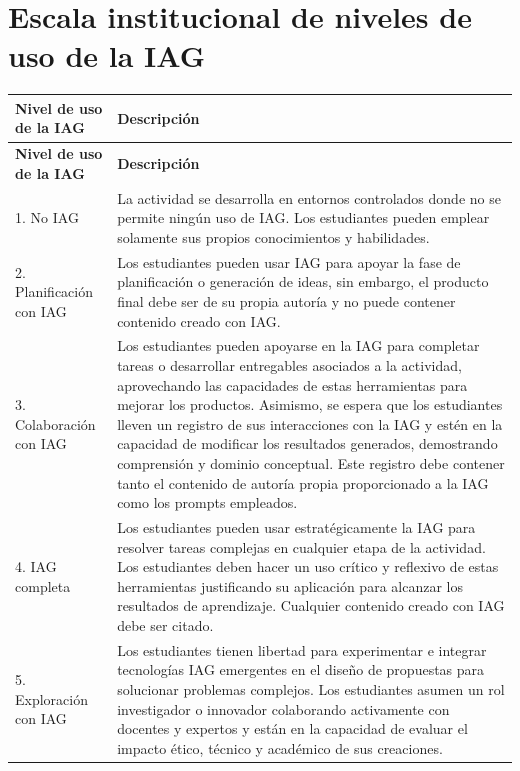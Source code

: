 \documentclass[11pt,a4paper]{article}
\begin{document}
\vspace{0.3cm}

\section*{Escala institucional de niveles de uso de la IAG}

\begin{center}
\small
\setlength{\tabcolsep}{4pt}
\begin{longtable}{|p{5cm}|p{10cm}|}
\hline
\textbf{Nivel de uso de la IAG} & \textbf{Descripción} \\
\hline
\endfirsthead

\hline
\textbf{Nivel de uso de la IAG} & \textbf{Descripción} \\
\hline
\endhead

1. No IAG &
La actividad se desarrolla en entornos controlados donde no se permite ningún uso de IAG. Los estudiantes pueden emplear solamente sus propios conocimientos y habilidades. \\
\hline

2. Planificación con IAG &
Los estudiantes pueden usar IAG para apoyar la fase de planificación o generación de ideas, sin embargo, el producto final debe ser de su propia autoría y no puede contener contenido creado con IAG. \\
\hline

3. Colaboración con IAG &
Los estudiantes pueden apoyarse en la IAG para completar tareas o desarrollar entregables asociados a la actividad, aprovechando las capacidades de estas herramientas para mejorar los productos. Asimismo, se espera que los estudiantes lleven un registro de sus interacciones con la IAG y estén en la capacidad de modificar los resultados generados, demostrando comprensión y dominio conceptual. Este registro debe contener tanto el contenido de autoría propia proporcionado a la IAG como los prompts empleados. \\
\hline

4. IAG completa &
Los estudiantes pueden usar estratégicamente la IAG para resolver tareas complejas en cualquier etapa de la actividad. Los estudiantes deben hacer un uso crítico y reflexivo de estas herramientas justificando su aplicación para alcanzar los resultados de aprendizaje. Cualquier contenido creado con IAG debe ser citado. \\
\hline

5. Exploración con IAG &
Los estudiantes tienen libertad para experimentar e integrar tecnologías IAG emergentes en el diseño de propuestas para solucionar problemas complejos. Los estudiantes asumen un rol investigador o innovador colaborando activamente con docentes y expertos y están en la capacidad de evaluar el impacto ético, técnico y académico de sus creaciones. \\
\hline

\end{longtable}
\end{center}
\end{document}
